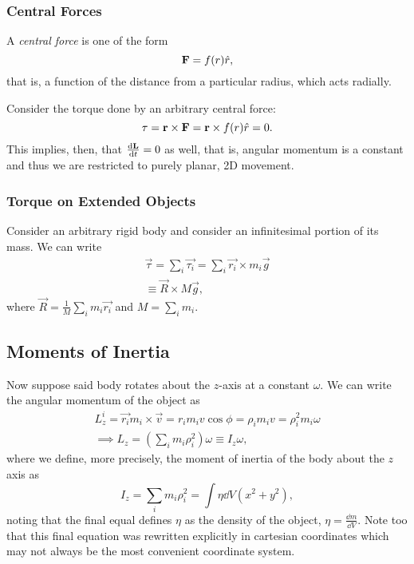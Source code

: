 \documentclass[12pt]{article}
\begin{document}
\subsubsection{Central Forces}

\begin{definition}
  A \emph{central force} is one of the form \[
  \vb{F} = f(r) \hat{r},  
  \]
  that is, a function of the distance from a particular radius, which acts radially.
\end{definition}

Consider the torque done by an arbitrary central force:
\[
  \vb{\tau} = \vb{r} \times \vb{F} = \vb{r} \times f(r) \hat{r} = 0.  
\]
This implies, then, that $\dv{\vb{L}}{t} = 0$ as well, that is, angular momentum is a constant and thus we are restricted to purely planar, 2D movement.

\subsubsection{Torque on Extended Objects}
Consider an arbitrary rigid body and consider an infinitesimal portion of its mass. We can write \begin{align*}
  \vec{\tau} = \sum_i \vec{\tau_i} = \sum_i \vec{r_i} \times m_i \vec{g}\\
  \equiv \vec{R} \times M\vec{g},
\end{align*}
where $\vec{R} = \frac{1}{M} \sum_{i} m_i \vec{r_i}$ and $M = \sum_i m_i$.

\subsection{Moments of Inertia}

Now suppose said body rotates about the $z$-axis at a constant $\omega$. We can write the angular momentum of the object as \begin{align*}
  L_z^i = \vec{r_i} m_i \times \vec{v} = r_i m_i v \cos \phi = \rho_i m_i v = \rho_i^2 m_i \omega\\
  \implies L_z = \left(\sum_i m_i \rho_i^2\right)\omega \equiv I_z \omega,
\end{align*}
where we define, more precisely, the moment of inertia of the body about the $z$ axis as \[
I_z = \sum_i m_i \rho_i^2 = \int \eta \dd{V} (x^2 + y^2),  
\]
noting that the final equal defines $\eta$ as the density of the object, $\eta = \frac{\dd{m}}{\dd{V}}$. Note too that this final equation was rewritten explicitly in cartesian coordinates which may not always be the most convenient coordinate system. 
\end{document}

